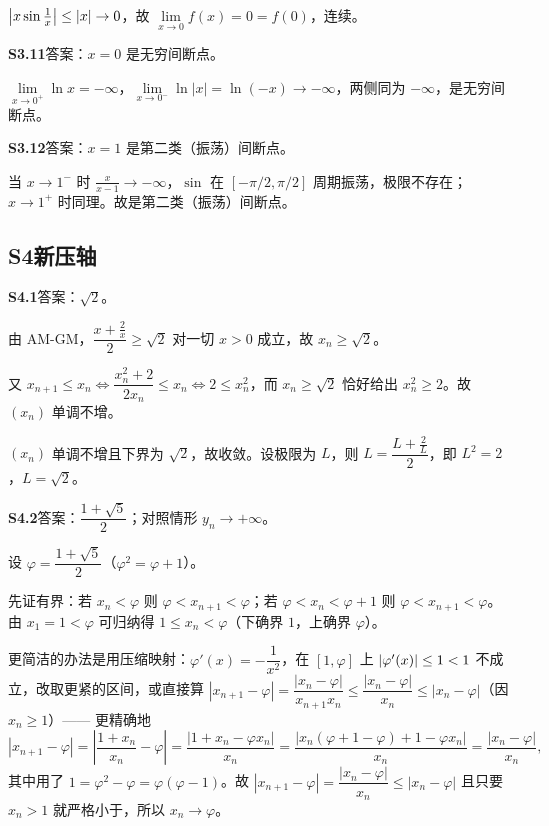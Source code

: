 $\left\lvert x\sin\frac1x\right\rvert\leq\left\lvert x\right\rvert\to0$，故 $\lim\limits_{x\to0}f(x)=0=f(0)$，连续。

\medskip
\noindent\textbf{S3.11}\quad 答案：$x=0$ 是无穷间断点。

$\lim\limits_{x\to0^{+}}\ln x=-\infty$，$\lim\limits_{x\to0^{-}}\ln|x|=\ln(-x)\to-\infty$，两侧同为 $-\infty$，是无穷间断点。

\medskip
\noindent\textbf{S3.12}\quad 答案：$x=1$ 是第二类（振荡）间断点。

当 $x\to1^{-}$ 时 $\frac{x}{x-1}\to-\infty$，$\sin$ 在 $[-\pi/2,\pi/2]$ 周期振荡，极限不存在；$x\to1^{+}$ 时同理。故是第二类（振荡）间断点。

\subsection{S4\quad 新压轴}

\noindent\textbf{S4.1}\quad 答案：$\sqrt2$。

由 AM-GM，$\dfrac{x+\frac2x}{2}\geq\sqrt2$ 对一切 $x>0$ 成立，故 $x_{n}\geq\sqrt2$。

又 $x_{n+1}\leq x_{n}\iff \dfrac{x_{n}^{2}+2}{2x_{n}}\leq x_{n}\iff 2\leq x_{n}^{2}$，而 $x_{n}\geq\sqrt2$ 恰好给出 $x_{n}^{2}\geq2$。故 $(x_{n})$ 单调不增。

$(x_{n})$ 单调不增且下界为 $\sqrt2$，故收敛。设极限为 $L$，则 $L=\dfrac{L+\frac2L}{2}$，即 $L^{2}=2$，$L=\sqrt2$。

\medskip
\noindent\textbf{S4.2}\quad 答案：$\dfrac{1+\sqrt5}{2}$；对照情形 $y_{n}\to+\infty$。

设 $\varphi=\dfrac{1+\sqrt5}{2}$（$\varphi^{2}=\varphi+1$）。

先证有界：若 $x_n<\varphi$ 则 $\varphi<x_{n+1}<\varphi$；若 $\varphi<x_n<\varphi+1$ 则 $\varphi<x_{n+1}<\varphi$。由 $x_1=1<\varphi$ 可归纳得 $1\leq x_n<\varphi$（下确界 $1$，上确界 $\varphi$）。

更简洁的办法是用压缩映射：$\varphi'(x)=-\dfrac{1}{x^{2}}$，在 $[1,\varphi]$ 上 $\left\lvert \varphi'(x)\right\rvert\leq1<1$ 不成立，改取更紧的区间，或直接算 $|x_{n+1}-\varphi|=\dfrac{|x_n-\varphi|}{x_{n+1}x_n}\leq\dfrac{|x_n-\varphi|}{x_n}\leq |x_n-\varphi|$（因 $x_n\geq1$）—— 更精确地
\[
|x_{n+1}-\varphi|=\left|\frac{1+x_n}{x_n}-\varphi\right|
=\frac{|1+x_n-\varphi x_n|}{x_n}
=\frac{|x_n(\varphi+1-\varphi)+1-\varphi x_n|}{x_n}
=\frac{|x_n-\varphi|}{x_n},
\]
其中用了 $1=\varphi^{2}-\varphi=\varphi(\varphi-1)$。故 $|x_{n+1}-\varphi|=\dfrac{|x_n-\varphi|}{x_n}\leq|x_n-\varphi|$ 且只要 $x_n>1$ 就严格小于，所以 $x_n\to\varphi$。

